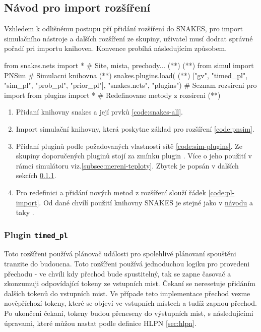 \subsection{Návod pro import rozšíření}
Vzhledem k odlišnému postupu pří přidání rozšíření do SNAKES, pro import simulačního nástroje a dalších rozšíření ze skupiny, uživatel musí dodrat správné pořadí pri importu knihoven. Konvence probíhá následujícím způsobem.

\begin{python}
  from snakes.nets import *   # Site, mista, prechody... (*\label{code:snakes-all}*) (*\label{code:plugin-setup}*)
  from simul import PNSim     # Simulacni knihovna (*\label{code:pnsim}*)
  snakes.plugins.load( (*\label{code:sim-plugins}*)
    ["gv", "timed_pl", "sim_pl", "prob_pl", "prior_pl"],
    "snakes.nets",
    "plugins") # Seznam rozsireni pro import
  from plugins import * # Redefinovane metody z rozsireni (*\label{code:pl-import}*)
\end{python}

\begin{enumerate}
  \item Přidaní knihovny snakes a její prvků \ref{code:snakes-all}.
  \item Import simulační knihovny, která poskytne základ pro rozšíření \ref{code:pnsim}.
  \item Přidaní pluginů podle požadovaných vlastností sítě \ref{code:sim-plugins}. Ze skupiny doporučených pluginů stojí za zmínku plugin \href{https://www.ibisc.univ-evry.fr/~fpommereau/SNAKES/API/plugins/gv.html}{}. Více o jeho použití v rámci simulátoru viz.\ref{subsec:mereni-teploty}. Zbytek je popsán v dalších sekcích \ref{subsec:timed_pl}.
  \item Pro redefinici a přidání nových metod z rozšíření slouží řádek \ref{code:pl-import}. Od dané chvílí použití knihovny SNAKES je stejné jako v \href{https://www.ibisc.univ-evry.fr/~fpommereau/SNAKES/first-steps-with-snakes.html}{návodu} a taky .
\end{enumerate}

\subsubsection{Plugin \texttt{timed\_pl}}
\label{subsec:timed_pl}
Toto rozšířeni používá plánovač události pro spolehlivé plánovaní spouštěni tranzite do budoucna. Toto rozšířeni používá jednoduchou logiku pro provedeni přechodu - ve chvíli kdy přechod bude spustitelný, tak se zapne časovač a zkonzumuji odpovídající tokeny ze vstupních mist. Čekaní se neresetuje přidáním dalších tokenů do vstupních mist. Ve případe teto implementace přechod vezme nověpříchozí tokeny, které se objeví ve vstupních místech a tudíž zapnou přechod. Po ukončeni čekaní, tokeny budou přeneseny do výstupních mist, s následujícími úpravami, které můžou nastat podle definice HLPN \ref{sec:hlpn}.


